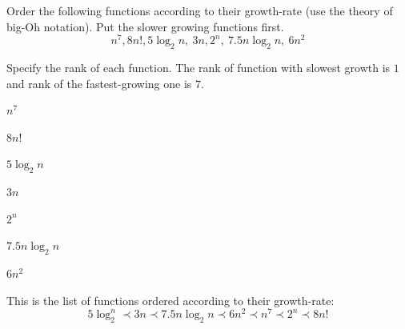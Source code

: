 \documentclass{ximera}
\begin{document}
\begin{question}
Order the following functions according to their growth-rate (use the theory of big-Oh notation). Put the slower growing functions first.
\[
n^7, 8n!, 5 \log_2 n,~ 3n, 2^n, ~ 7.5 n\log_2 n, ~ 6 n^2
\]
\begin{solution}
Specify the rank of each function. The rank of function with slowest growth is $1$ and rank of the fastest-growing one is $7$.
\begin{question}
$n^7$  
\end{question}
\begin{question}
$8n!$  
\end{question}
\begin{question}
$5 \log_2 n$  
\end{question}
\begin{question}
$3n$  
\end{question}
\begin{question}
$2^n$   
\end{question}
\begin{question}
$7.5 n \log_2 n$   
\end{question}
\begin{question}
$6 n^2$ 
\end{question}

\end{solution}

This is the list of functions ordered according to their growth-rate:
\begin{equation*}
5 \log_2^n \prec 3n \prec 7.5 n \log_2{n} \prec 6n^2 \prec n^7 \prec 2^n \prec 8n!
\end{equation*}
\end{question}
\end{document}
